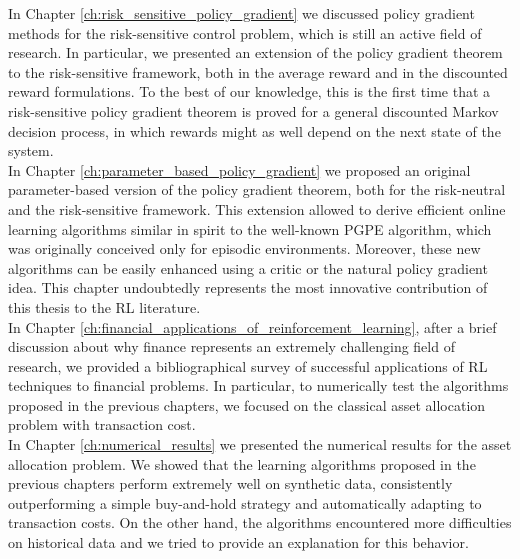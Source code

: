 In Chapter \ref{ch:risk_sensitive_policy_gradient} we discussed policy gradient methods for the risk-sensitive control problem, which is still an active field of research. In particular, we presented an extension of the policy gradient theorem to the risk-sensitive framework, both in the average reward and in the discounted reward formulations. To the best of our knowledge, this is the first time that a risk-sensitive policy gradient theorem is proved for a general discounted Markov decision process, in which rewards might as well depend on the next state of the system.\\
In Chapter \ref{ch:parameter_based_policy_gradient} we proposed an original parameter-based version of the policy gradient theorem, both for the risk-neutral and the risk-sensitive framework. This extension allowed to derive efficient online learning algorithms similar in spirit to the well-known \gls{PGPE} algorithm, which was originally conceived only for episodic environments. Moreover, these new algorithms can be easily enhanced using a critic or the natural policy gradient idea. This chapter undoubtedly represents the most innovative contribution of this thesis to the \gls{RL} literature.\\ 
In Chapter \ref{ch:financial_applications_of_reinforcement_learning}, after a brief discussion about why finance represents an extremely challenging field of research, we provided a bibliographical survey of successful applications of \gls{RL} techniques to financial problems. In particular, to numerically test the algorithms proposed in the previous chapters, we focused on the classical asset allocation problem with transaction cost.\\
In Chapter \ref{ch:numerical_results} we presented the numerical results for the asset allocation problem. We showed that the learning algorithms proposed in the previous chapters perform extremely well on synthetic data, consistently outperforming a simple buy-and-hold strategy and automatically adapting to transaction costs. On the other hand, the algorithms encountered more difficulties on historical data and we tried to provide an explanation for this behavior.\\

